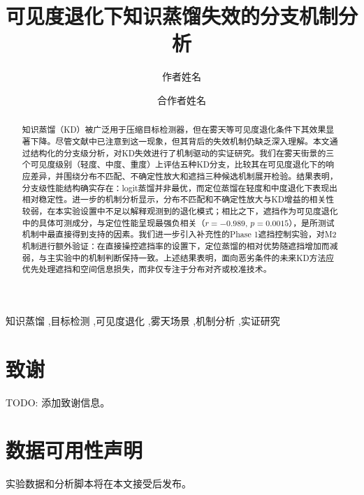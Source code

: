 \documentclass[preprint,12pt,a4paper]{elsarticle}
\begin{document}
\begin{frontmatter}

\title{可见度退化下知识蒸馏失效的分支机制分析}

\author[1]{作者姓名}

\author[1]{合作者姓名}

\address[1]{院系, 大学, 地址}

\begin{abstract}
知识蒸馏（KD）被广泛用于压缩目标检测器，但在雾天等可见度退化条件下其效果显著下降。尽管文献中已注意到这一现象，但其背后的失效机制仍缺乏深入理解。本文通过结构化的分支级分析，对KD失效进行了机制驱动的实证研究。我们在雾天街景的三个可见度级别（轻度、中度、重度）上评估五种KD分支，比较其在可见度退化下的响应差异，并围绕分布不匹配、不确定性放大和遮挡三种候选机制展开检验。结果表明，分支级性能结构确实存在：logit蒸馏并非最优，而定位蒸馏在轻度和中度退化下表现出相对稳定性。进一步的机制分析显示，分布不匹配和不确定性放大与KD增益的相关性较弱，在本实验设置中不足以解释观测到的退化模式；相比之下，遮挡作为可见度退化中的具体可测成分，与定位性能呈现最强负相关（$r=-0.989$, $p=0.0015$），是所测试机制中最直接得到支持的因素。我们进一步引入补充性的Phase 1遮挡控制实验，对M2机制进行额外验证：在直接操控遮挡率的设置下，定位蒸馏的相对优势随遮挡增加而减弱，与主实验中的机制判断保持一致。上述结果表明，面向恶劣条件的未来KD方法应优先处理遮挡和空间信息损失，而非仅专注于分布对齐或校准技术。
\end{abstract}

\begin{keyword}
知识蒸馏 \sep 目标检测 \sep 可见度退化 \sep 雾天场景 \sep 机制分析 \sep 实证研究
\end{keyword}

\end{frontmatter}









\section*{致谢}
TODO: 添加致谢信息。

\section*{数据可用性声明}
实验数据和分析脚本将在本文接受后发布。


\end{document}
